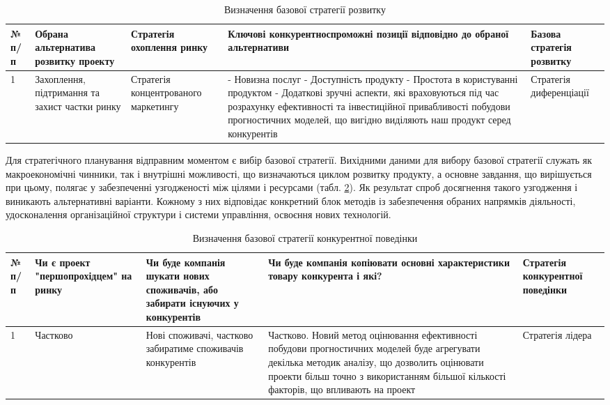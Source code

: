 \begin{table}[H]
\fontsize{12pt}{12pt}\selectfont
	\begin{tabularx}{\textwidth}{|l|X|X|X|X|}
    \hline
    № п/п & Обрана альтернатива розвитку проекту & Стратегія охоплення ринку & Ключові конкурентноспроможні позиції відповідно до обраної альтернативи & Базова стратегія розвитку \\ \hline
    1 & Захоплення, підтримання та захист частки ринку & Стратегія концентрованого маркетингу & - Новизна послуг
    - Доступність продукту
    - Простота в користуванні продуктом
    - Додаткові зручні аспекти, які враховуються під час розрахунку ефективності та інвестиційної привабливості побудови прогностичних моделей, що вигідно виділяють наш продукт серед конкурентів & Стратегія диференціації \\
    \hline
    \end{tabularx}
\caption{Визначення базової стратегії розвитку} \label{tab:stab_11}
\end{table}

Для стратегічного планування відправним моментом є вибір базової стратегії. Вихідними даними для вибору базової стратегії служать як макроекономічні чинники, так і внутрішні можливості, що визначаються циклом розвитку продукту, а основне завдання, що вирішується при цьому, полягає у забезпеченні узгодженості між цілями і ресурсами (табл. \ref{tab:stab_12}). Як результат спроб досягнення такого узгодження і виникають альтернативні варіанти. Кожному з них відповідає конкретний блок методів із забезпечення обраних напрямків діяльності, удосконалення організаційної структури і системи управління, освоєння нових технологій.

\begin{table}[H]
\fontsize{12pt}{12pt}\selectfont
	\begin{tabularx}{\textwidth}{|l|X|X|X|X|}
    \hline
    № п/п & Чи є проект "першопрохідцем" на ринку & Чи буде компанія шукати нових споживачів, або забирати існуючих у конкурентів & Чи буде компанія копіювати основні характеристики товару конкурента і які? & Стратегія конкурентної поведінки \\ \hline
    1 & Частково & Нові споживачі, частково забиратиме споживачів конкурентів & Частково. Новий метод оцінювання ефективності побудови прогностичних моделей буде агрегувати декілька методик аналізу, що дозволить оцінювати проекти більш точно з використанням більшої кількості факторів, що впливають на проект & Стратегія лідера \\
    \hline
    \end{tabularx}
\caption{Визначення базової стратегії конкурентної поведінки} \label{tab:stab_12}
\end{table}

